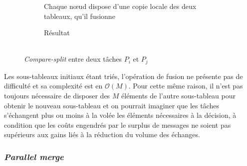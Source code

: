 \begin{figure}[!h]
\begin{center}
\begin{subfigure}[b]{0.40\columnwidth}
\begin{center}
\caption{Chaque nœud dispose d'une copie locale des deux tableaux, qu'il fusionne}
\label{fig:bitonic4}
\end{center}
\end{subfigure}%
\hfill
\begin{subfigure}[b]{0.2\columnwidth}
\begin{center}
\caption{Résultat\\~}
\label{fig:bitonic5}
\end{center}
\end{subfigure}
\end{center}
\caption{\textit{Compare-split} entre deux tâches $P_i$ et $P_j$}
\end{figure}

Les sous-tableaux initiaux étant triés, l'opération de fusion ne présente pas de difficulté et sa complexité est en $\mathcal{O}(M)$. Pour cette même raison, il n'est pas toujours nécessaire de disposer des $M$ éléments de l'autre sous-tableau pour obtenir le nouveau sous-tableau et on pourrait imaginer que les tâches s'échangent plus ou moins à la volée les éléments nécessaires à la décision, à condition que les coûts engendrés par le surplus de messages ne soient pas supérieurs aux gains liés à la réduction du volume des échanges.

\subsubsection{\textit{Parallel merge}}

